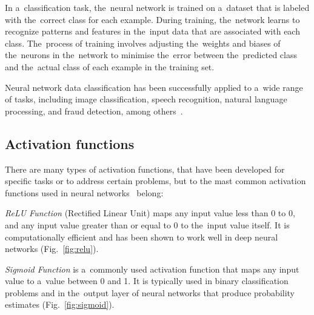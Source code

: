     In a~classification task, the~neural network is trained on a~dataset that is labeled with the~correct
class for each example. During training, the~network learns to recognize patterns and features in the~input data
that are associated with each class. The~process of training involves adjusting the~weights and biases of the~neurons in the~network to minimise the~error between the~predicted class and the~actual class of each example in the training set.

    Neural network data classification has been successfully applied to a~wide range of tasks, including image
classification, speech recognition, natural language processing, and fraud detection, among others~\cite{feraud2002methodology}.

    \subsection{Activation functions} \label{subsec:nnaf}
    There are many types of activation functions, that have been developed
    for specific tasks or to address certain problems, but to the mast common activation functions used in neural networks~\cite{geron2022hands} belong:

\emph{ReLU Function} (Rectified Linear Unit) maps any input value less than 0 to 0, and any input value greater than or equal to 0 to the~input value itself. It is computationally efficient and has been shown to work well in deep neural networks (Fig.~\ref{fig:relu}).

\emph{Sigmoid Function} is a~commonly used activation function that maps any input value to a~value between 0 and 1. It is typically used in binary classification problems and in the~output layer of neural networks that produce probability estimates (Fig.~\ref{fig:sigmoid}).

